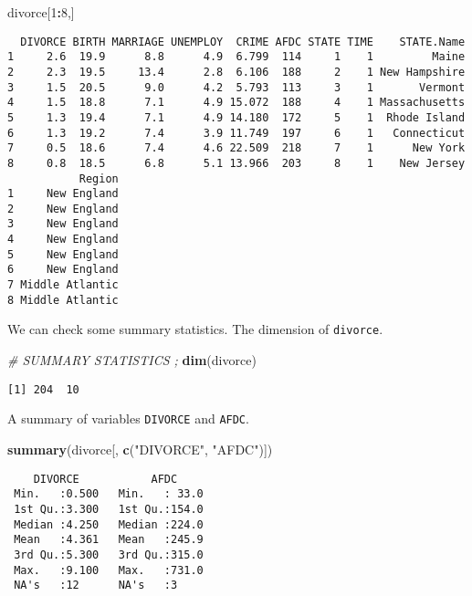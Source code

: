 \documentclass[]{book}
\newenvironment{Shaded}{\begin{snugshade}}{\end{snugshade}}
\newcommand{\CommentTok}[1]{\textcolor[rgb]{0.56,0.35,0.01}{\textit{#1}}}
\newcommand{\DecValTok}[1]{\textcolor[rgb]{0.00,0.00,0.81}{#1}}
\newcommand{\KeywordTok}[1]{\textcolor[rgb]{0.13,0.29,0.53}{\textbf{#1}}}
\newcommand{\NormalTok}[1]{#1}
\newcommand{\OperatorTok}[1]{\textcolor[rgb]{0.81,0.36,0.00}{\textbf{#1}}}
\newcommand{\StringTok}[1]{\textcolor[rgb]{0.31,0.60,0.02}{#1}}
\begin{document}
\begin{Shaded}
\begin{Highlighting}[]
\NormalTok{divorce[}\DecValTok{1}\OperatorTok{:}\DecValTok{8}\NormalTok{,]}
\end{Highlighting}
\end{Shaded}

\begin{verbatim}
  DIVORCE BIRTH MARRIAGE UNEMPLOY  CRIME AFDC STATE TIME    STATE.Name
1     2.6  19.9      8.8      4.9  6.799  114     1    1         Maine
2     2.3  19.5     13.4      2.8  6.106  188     2    1 New Hampshire
3     1.5  20.5      9.0      4.2  5.793  113     3    1       Vermont
4     1.5  18.8      7.1      4.9 15.072  188     4    1 Massachusetts
5     1.3  19.4      7.1      4.9 14.180  172     5    1  Rhode Island
6     1.3  19.2      7.4      3.9 11.749  197     6    1   Connecticut
7     0.5  18.6      7.4      4.6 22.509  218     7    1      New York
8     0.8  18.5      6.8      5.1 13.966  203     8    1    New Jersey
           Region
1     New England
2     New England
3     New England
4     New England
5     New England
6     New England
7 Middle Atlantic
8 Middle Atlantic
\end{verbatim}

We can check some summary statistics. The dimension of \texttt{divorce}.

\begin{Shaded}
\begin{Highlighting}[]
\CommentTok{#  SUMMARY STATISTICS  ;}
\KeywordTok{dim}\NormalTok{(divorce)}
\end{Highlighting}
\end{Shaded}

\begin{verbatim}
[1] 204  10
\end{verbatim}

A summary of variables \texttt{DIVORCE} and \texttt{AFDC}.

\begin{Shaded}
\begin{Highlighting}[]
\KeywordTok{summary}\NormalTok{(divorce[, }\KeywordTok{c}\NormalTok{(}\StringTok{"DIVORCE"}\NormalTok{, }\StringTok{"AFDC"}\NormalTok{)])}
\end{Highlighting}
\end{Shaded}

\begin{verbatim}
    DIVORCE           AFDC      
 Min.   :0.500   Min.   : 33.0  
 1st Qu.:3.300   1st Qu.:154.0  
 Median :4.250   Median :224.0  
 Mean   :4.361   Mean   :245.9  
 3rd Qu.:5.300   3rd Qu.:315.0  
 Max.   :9.100   Max.   :731.0  
 NA's   :12      NA's   :3      
\end{verbatim}
\end{document}
